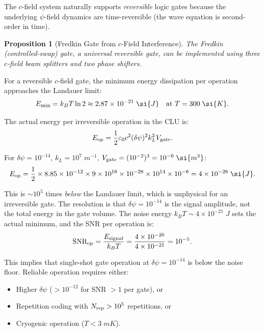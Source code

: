 \documentclass[aps,prd,twocolumn,superscriptaddress,nofootinbib,floatfix]{revtex4-2}
\newcommand{\cvac}{c}
\newcommand{\ee}[1]{\times 10^{#1}}
\newtheorem{proposition}[theorem]{Proposition}
\begin{document}
The $c$-field system naturally supports \emph{reversible}
logic gates because the underlying $\psi$-field dynamics
are time-reversible (the wave equation is second-order in time).

\begin{proposition}[Fredkin Gate from $c$-Field Interference]
The Fredkin (controlled-swap) gate, a universal reversible gate,
can be implemented using three $c$-field beam splitters and
two phase shifters.
\end{proposition}

For a reversible $c$-field gate, the minimum energy dissipation
per operation approaches the Landauer limit:
\begin{equation}
E_{\rm min} = k_BT\ln 2 \approx 2.87\ee{-21}\;\si{J} \quad \text{at } T = 300\;\si{K}.
\end{equation}

The actual energy per irreversible operation in the CLU is:
\begin{equation}
E_{\rm op} = \frac{1}{2}\varepsilon_0\cvac^2(\delta\psi)^2 k_L^2 V_{\rm gate}.
\end{equation}

For $\delta\psi = 10^{-14}$, $k_L = 10^7\;\si{m^{-1}}$,
$V_{\rm gate} = (10^{-2})^3 = 10^{-6}\;\si{m^3}$:
\begin{equation}
E_{\rm op} = \frac{1}{2}\times 8.85\ee{-12}\times 9\ee{16}\times 10^{-28}\times 10^{14}\times 10^{-6}
= 4\ee{-26}\;\si{J}.
\end{equation}

This is $\sim 10^5$ times \emph{below} the Landauer limit,
which is unphysical for an irreversible gate.  The resolution
is that $\delta\psi = 10^{-14}$ is the signal amplitude, not
the total energy in the gate volume.  The noise energy
$k_BT \sim 4\ee{-21}\;\si{J}$ sets the actual minimum, and
the SNR per operation is:
\begin{equation}
\text{SNR}_{\rm op} = \frac{E_{\rm signal}}{k_BT} = \frac{4\ee{-26}}{4\ee{-21}} = 10^{-5}.
\end{equation}

This implies that single-shot gate operation at
$\delta\psi = 10^{-14}$ is below the noise floor.
Reliable operation requires either:
\begin{itemize}
\item Higher $\delta\psi$ ($> 10^{-12}$ for SNR $> 1$ per gate), or
\item Repetition coding with $N_{\rm rep} > 10^5$ repetitions, or
\item Cryogenic operation ($T < 3\;\si{mK}$).
\end{itemize}
\end{document}
